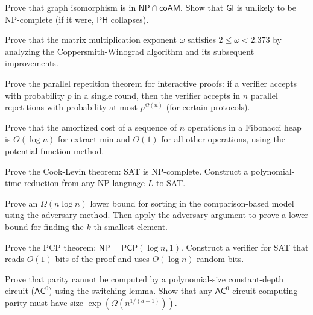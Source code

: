 \documentclass[12pt,a4paper]{exam}
\begin{document}
\begin{questions}
\question[7]
Prove that graph isomorphism is in $\mathsf{NP} \cap \mathsf{coAM}$. Show that $\mathsf{GI}$ is unlikely to be NP-complete (if it were, $\mathsf{PH}$ collapses).

\vspace{0.3cm}

\question[5]
Prove that the matrix multiplication exponent $\omega$ satisfies $2 \leq \omega < 2.373$ by analyzing the Coppersmith-Winograd algorithm and its subsequent improvements.

\vspace{0.3cm}

\question[5]
Prove the parallel repetition theorem for interactive proofs: if a verifier accepts with probability $p$ in a single round, then the verifier accepts in $n$ parallel repetitions with probability at most $p^{\Omega(n)}$ (for certain protocols).

\vspace{0.3cm}

\question[5]
Prove that the amortized cost of a sequence of $n$ operations in a Fibonacci heap is $O(\log n)$ for extract-min and $O(1)$ for all other operations, using the potential function method.

\vspace{0.3cm}

\question[7]
Prove the Cook-Levin theorem: SAT is NP-complete. Construct a polynomial-time reduction from any NP language $L$ to SAT.

\vspace{0.3cm}

\question[2]
Prove an $\Omega(n \log n)$ lower bound for sorting in the comparison-based model using the adversary method. Then apply the adversary argument to prove a lower bound for finding the $k$-th smallest element.

\vspace{0.3cm}

\question[4]
Prove the PCP theorem: $\mathsf{NP} = \mathsf{PCP}(\log n, 1)$. Construct a verifier for SAT that reads $O(1)$ bits of the proof and uses $O(\log n)$ random bits.

\vspace{0.3cm}

\question[4]
Prove that parity cannot be computed by a polynomial-size constant-depth circuit ($\mathsf{AC}^0$) using the switching lemma. Show that any $\mathsf{AC}^0$ circuit computing parity must have size $\exp(\Omega(n^{1/(d-1)}))$.

\vspace{0.3cm}


\end{questions}
\end{document}
